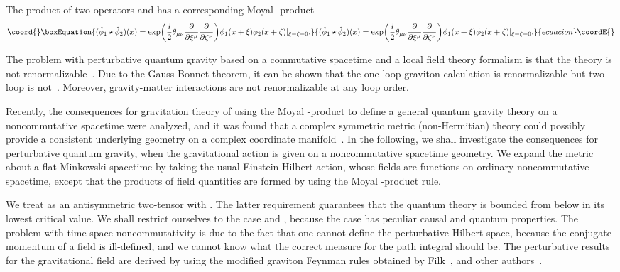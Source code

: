 \documentclass[a4paper,10pt]{article}
\begin{document}
The product of two operators \coordHE{} and \coordHE{}
has a corresponding Moyal \myHighlight{$\star$}\coordHE{}-product
\begin{equation}\coord{}\boxEquation{
({\hat\phi}_1\star{\hat\phi}_2)(x)
=\exp\biggr(\frac{i}{2}\theta_{\mu\nu}\frac{\partial}{\partial\xi^\mu}\frac{\partial}
{\partial\zeta^\nu}\biggr)\phi_1(x+\xi)\phi_2(x+\zeta)\vert_{\xi=\zeta=0}.
}{
({\hat\phi}_1\star{\hat\phi}_2)(x)
=\exp\biggr(\frac{i}{2}\theta_{\mu\nu}\frac{\partial}{\partial\xi^\mu}\frac{\partial}
{\partial\zeta^\nu}\biggr)\phi_1(x+\xi)\phi_2(x+\zeta)\vert_{\xi=\zeta=0}.
}{ecuacion}\coordE{}\end{equation}

The problem with perturbative quantum gravity
based on a commutative spacetime and a local field theory
formalism is that the theory is not
renormalizable~\cite{Veltman,Van}. Due to the Gauss-Bonnet
theorem, it can be shown that the one loop graviton calculation
is renormalizable but two loop is not~\cite{Sagnotti}.
Moreover, gravity-matter interactions are not renormalizable at
any loop order.

Recently, the consequences for gravitation theory of using the Moyal
\myHighlight{$\star$}\coordHE{}-product to define a general quantum gravity theory on a
noncommutative spacetime were analyzed, and it was found that a complex
symmetric metric (non-Hermitian) theory could possibly provide a consistent
underlying geometry on a complex coordinate manifold~\cite{Moffat}.
In the following, we shall investigate the consequences for
perturbative quantum gravity, when the gravitational action is given on a
noncommutative spacetime geometry. We expand the metric about a
flat Minkowski spacetime by taking the usual Einstein-Hilbert action, whose
fields are functions on ordinary noncommutative spacetime, except that the
products of field quantities are formed by using the Moyal \myHighlight{$\star$}\coordHE{}-product
rule.

We treat \myHighlight{$\theta^{\mu\nu}$}\coordHE{} as an antisymmetric two-tensor with
\coordHE{}. The latter requirement guarantees that
the quantum theory is bounded from below in its lowest critical value. We
shall restrict ourselves to the case \coordHE{} and
\coordHE{}, because the \coordHE{} case has peculiar causal
and quantum properties. The problem with time-space noncommutativity is due
to the fact that one cannot define the perturbative Hilbert space,
because the conjugate momentum of a field is ill-defined, and we cannot
know what the correct measure for the path integral should be. The
perturbative results for the gravitational field are derived by using the
modified graviton Feynman rules obtained by Filk~\cite{Filk}, and other
authors~\cite{Varilly,Martin,Chaichian,Ishibashi,Chepelev,Minwalla,Hawkins,Jabbari,Micu}.
\end{document}
